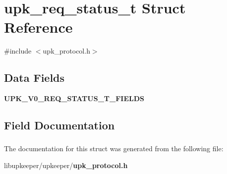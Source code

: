 \section{upk\_\-req\_\-status\_\-t Struct Reference}
\label{structupk__req__status__t}


{\ttfamily \#include $<$upk\_\-protocol.h$>$}

\subsection*{Data Fields}
\begin{DoxyCompactItemize}
\item 
{\bf UPK\_\-V0\_\-REQ\_\-STATUS\_\-T\_\-FIELDS}
\end{DoxyCompactItemize}


\subsection{Field Documentation}
\subsubsection[{UPK\_\-V0\_\-REQ\_\-STATUS\_\-T\_\-FIELDS}]{}\label{structupk__req__status__t_a87e1da7d16a42b83b5c3b0478943f81d}


The documentation for this struct was generated from the following file:\begin{DoxyCompactItemize}
\item 
libupkeeper/upkeeper/{\bf upk\_\-protocol.h}\end{DoxyCompactItemize}
